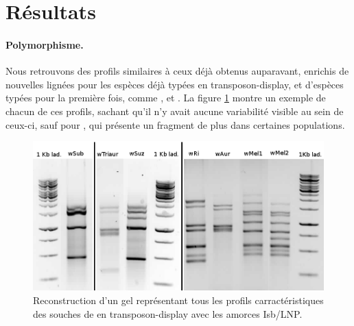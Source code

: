 \section{Résultats} %
\label{sec:résultats}

\paragraph{Polymorphisme.} %
\label{par:polymorphisme}
Nous retrouvons des profils similaires à ceux déjà obtenus auparavant\cite{memHH}, enrichis de nouvelles lignées pour les espèces déjà typées en transposon-display, et d’espèces typées pour la première fois, comme ,  et . %
La figure \ref{fig:profils} montre un exemple de chacun de ces profils, sachant qu’il n’y avait aucune variabilité visible au sein de ceux-ci, sauf pour , qui présente un fragment de plus %
dans certaines populations.

\begin{figure}[tb]
	\begin{center}
		\includegraphics[width=150mm]{images/profils_crop.png}
	\end{center}
	\caption{Reconstruction d'un gel représentant tous les profils carractéristiques des souches de  en transposon-display avec les amorces Isb/LNP.}
	\label{fig:profils}
\end{figure}


